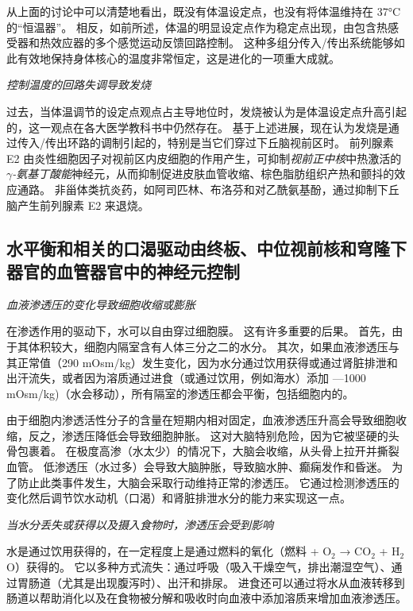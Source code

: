 从上面的讨论中可以清楚地看出，既没有体温设定点，也没有将体温维持在 37°C 的“恒温器”。
相反，如前所述，体温的明显设定点作为稳定点出现，由包含热感受器和热效应器的多个感觉运动反馈回路控制。
这种多组分传入/传出系统能够如此有效地保持身体核心的温度非常恒定，这是进化的一项重大成就。


\textit{控制温度的回路失调导致发烧}

过去，当体温调节的设定点观点占主导地位时，发烧被认为是体温设定点升高引起的，这一观点在各大医学教科书中仍然存在。
基于上述进展，现在认为发烧是通过传入/传出环路的调制引起的，特别是当它们穿过下丘脑视前区时。
前列腺素 E2 由炎性细胞因子对视前区内皮细胞的作用产生，可抑制\textit{视前正中核}中热激活的\textit{$\gamma$-氨基丁酸能}神经元，从而抑制促进皮肤血管收缩、棕色脂肪组织产热和颤抖的效应通路。
非甾体类抗炎药，如阿司匹林、布洛芬和对乙酰氨基酚，通过抑制下丘脑产生前列腺素 E2 来退烧。



\subsection{水平衡和相关的口渴驱动由终板、中位视前核和穹隆下器官的血管器官中的神经元控制}

\textit{血液渗透压的变化导致细胞收缩或膨胀}

在渗透作用的驱动下，水可以自由穿过细胞膜。
这有许多重要的后果。
首先，由于其体积较大，细胞内隔室含有人体三分之二的水分。
其次，如果血液渗透压与其正常值（290 mOsm/kg）发生变化，因为水分通过饮用获得或通过肾脏排泄和出汗流失，或者因为溶质通过进食（或通过饮用，例如海水）添加 —1000 mOsm/kg)（水会移动），所有隔室的渗透压都会平衡，包括细胞内的。


由于细胞内渗透活性分子的含量在短期内相对固定，血液渗透压升高会导致细胞收缩，反之，渗透压降低会导致细胞肿胀。
这对大脑特别危险，因为它被坚硬的头骨包裹着。
在极度高渗（水太少）的情况下，大脑会收缩，从头骨上拉开并撕裂血管。
低渗透压（水过多）会导致大脑肿胀，导致脑水肿、癫痫发作和昏迷。
为了防止此类事件发生，大脑会采取行动维持正常的渗透压。
它通过检测渗透压的变化然后调节饮水动机（口渴）和肾脏排泄水分的能力来实现这一点。


\textit{当水分丢失或获得以及摄入食物时，渗透压会受到影响}

水是通过饮用获得的，在一定程度上是通过燃料的氧化（燃料 + O$_2$ → CO$_2$ + H$_2$O）获得的。
它以多种方式流失：通过呼吸（吸入干燥空气，排出潮湿空气）、通过胃肠道（尤其是出现腹泻时）、出汗和排尿。
进食还可以通过将水从血液转移到肠道以帮助消化以及在食物被分解和吸收时向血液中添加溶质来增加血液渗透压。


